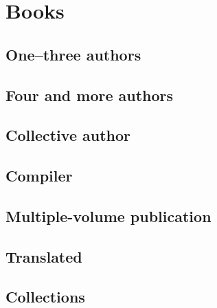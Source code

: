 \usepackage[ukrainian,russian]{babel}
\usepackage{bibunits,verbatim,bibnocap,geometry}
\usepackage{hyperref}
\usepackage{cmap}


\newcommand{\bibentry}[1]{
\begin{bibunit}
\nocite{*}
\putbib[bib/#1]
\nopagebreak

\end{bibunit}
}


	

\title{\mytitle}
\maketitle
\begin{abstract}
  \mydescription
\end{abstract}

\bibliographyunit[\section]


\section{Books}
\subsection{One--three authors}
\bibentry{ex01}
\bibentry{ex02}
\bibentry{ex03}
\subsection{Four and more authors}
\bibentry{ex04}
\bibentry{ex05}
\subsection{Collective author}
\bibentry{ex06}
\subsection{Compiler}
\bibentry{ex06a}
\subsection{Multiple-volume publication}
\bibentry{ex07}
\bibentry{ex08}
\bibentry{ex09}
\subsection{Translated}
\bibentry{ex10}
\subsection{Collections}
\bibentry{ex12}
